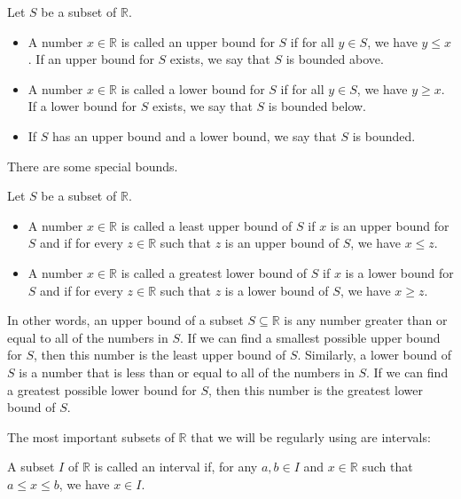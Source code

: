 \documentclass[10pt,a4paper,oneside]{book}
\begin{document}
\begin{definition}
    Let $S$ be a subset of $\mathbb{R}$.

    \begin{itemize}
        \item A number $x\in \mathbb{R}$ is called an upper bound for $S$ if for all $y\in S$, we have $y\leq x$. If an upper bound for $S$ exists, we say that $S$ is bounded above.
        \item A number $x\in \mathbb{R}$ is called a lower bound for $S$ if for all $y\in S$, we have $y\geq x$. If a lower bound for $S$ exists, we say that $S$ is bounded below.
        \item If $S$ has an upper bound and a lower bound, we say that $S$ is bounded.
    \end{itemize}
\end{definition}

There are some special bounds.
\begin{definition}
    Let $S$ be a subset of $\mathbb{R}$.

    \begin{itemize}
        \item A number $x\in \mathbb{R}$ is called a least upper bound of $S$ if $x$ is an upper bound for $S$ and if for every $z\in \mathbb{R}$ such that $z$ is an upper bound of $S$, we have $x\leq z$.
        \item A number $x\in \mathbb{R}$ is called a greatest lower bound of $S$ if $x$ is a lower bound for $S$ and if for every $z\in \mathbb{R}$ such that $z$ is a lower bound of $S$, we have $x\geq z$.
    \end{itemize}
\end{definition}

In other words, an upper bound of a subset $S\subseteq \mathbb{R}$ is any number greater than or equal to all of the numbers in $S$.
If we can find a smallest possible upper bound for $S$, then this number is the least upper bound of $S$. Similarly, a lower bound of $S$ is a number that is less than or equal to all of the numbers in $S$.
If we can find a greatest possible lower bound for $S$, then this number is the greatest lower bound of $S$.

The most important subsets of $\mathbb{R}$ that we will be regularly using are intervals:
\begin{definition}
    A subset $I$ of $\mathbb{R}$ is called an interval if, for any $a,b \in I$ and $x\in \mathbb{R}$ such that $a\leq x\leq b$, we have $x\in I$.
\end{definition}
\end{document}
